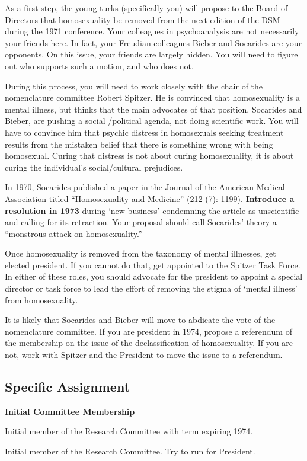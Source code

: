 \begin{refsection}
As a first step, the young turks (specifically you) will propose to the Board of Directors that homosexuality be removed from the next edition of the DSM during the 1971 conference. Your colleagues in psychoanalysis are not necessarily your friends here. In fact, your Freudian colleagues Bieber and Socarides are your opponents. On this issue, your friends are largely hidden. You will need to figure out who supports such a motion, and who does not.

During this process, you will need to work closely with the chair of the nomenclature committee Robert Spitzer. He is convinced that homosexuality is a mental illness, but thinks that the main advocates of that position, Socarides and Bieber, are pushing a social \slash  political agenda, not doing scientific work. You will have to convince him that psychic distress in homosexuals seeking treatment results from the mistaken belief that there is something wrong with being homosexual. Curing that distress is not about curing homosexuality, it is about curing the individual's social\slash cultural prejudices.

In 1970, Socarides published a paper in the Journal of the American Medical Association titled “Homosexuality and Medicine” (212 (7): 1199). \textbf{Introduce a resolution in 1973} during ‘new business’ condemning the article as unscientific and calling for its retraction. Your proposal should call Socarides' theory a “monstrous attack on homosexuality.”

Once homosexuality is removed from the taxonomy of mental illnesses, get elected president. If you cannot do that, get appointed to the Spitzer Task Force. In either of these roles, you should advocate for the president to appoint a special director or task force to lead the effort of removing the stigma of `mental illness' from homosexuality.

It is likely that Socarides and Bieber will move to abdicate the vote of the nomenclature committee. If you are president in 1974, propose a referendum of the membership on the issue of the declassification of homosexuality. If you are not, work with Spitzer and the President to move the issue to a referendum.

\subsection{Specific Assignment}
\label{specificassignment}

\textbf{Initial Committee Membership}
\begin{service}[Marmor]\label{service:marmor}
Initial member of the Research Committee with term expiring 1974.
\end{service}
Initial member of the Research Committee.
Try to run for President.


\end{refsection}
